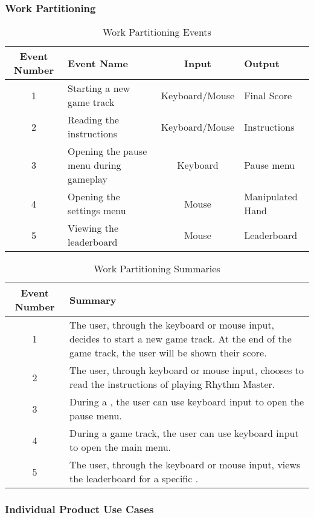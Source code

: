 \documentclass[12pt,letterpaper]{article}
\newcommand{\term}[2][]{\ifthenelse{\equal{#1}{}}{\hyperref[Term:#2]{\textbf{#2}}}{\hyperref[Term:#1]{\textbf{#2}}}}
\begin{document}
\subsubsection{Work Partitioning}
\begin{table}[h!]
\caption{Work Partitioning Events}
    \centering
    \begin{tabular}{|c|p{3.5cm}|c|p{3.5cm}|}
    \hline
    \textbf{Event Number} & \centering\textbf{Event Name} & \textbf{Input} & \textbf{Output} \\
    \hline
    1 & Starting a new game track & Keyboard/Mouse & Final Score \\
    \hline
    2 & Reading the instructions & Keyboard/Mouse & Instructions \\
    \hline
    3 & Opening the pause menu during gameplay & Keyboard & Pause menu \\
    \hline
    4 & Opening the settings menu & Mouse & Manipulated Hand \\
    \hline
    5 & Viewing the leaderboard & Mouse & Leaderboard \\
    \hline
    \end{tabular}
\end{table}

\begin{table}[h]
\caption{Work Partitioning Summaries}
    \centering
    \begin{tabular}{|c|p{10cm}|}
    \hline
    \textbf{Event Number} & \textbf{Summary} \\
    \hline
    1 & The user, through the keyboard or mouse input, decides to start a new game track. At the end of the game track, the user will be shown their score. \\
    \hline
    2 & The user, through keyboard or mouse input, chooses to read the instructions of playing Rhythm Master. \\
    \hline
    3 & During a \term[Game track]{game track}, the user can use keyboard input to open the pause menu. \\
    \hline
    4 & During a game track, the user can use keyboard input to open the main menu. \\
    \hline
    5 &  The user, through the keyboard or mouse input, views the leaderboard for a specific \term[Game track]{game track}.\\
    \hline
    \end{tabular}
\end{table}

\newpage
\subsubsection{Individual Product Use Cases}
\end{document}
